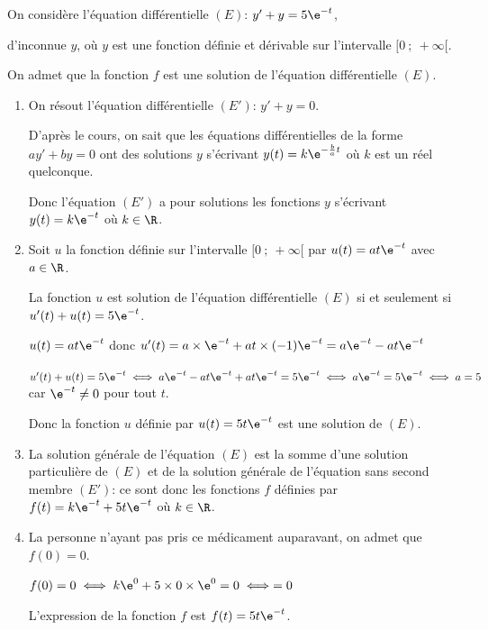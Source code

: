 \medskip

On considère l'équation différentielle  $(E)$: $y' +y = 5\e^{-t}$,

d'inconnue $y$, où $y$ est une fonction définie et dérivable sur l'intervalle $[0~;~+ \infty[$.

On admet que la fonction $f$ est une solution de l'équation différentielle $(E)$.



\begin{enumerate}
\item On résout l'équation différentielle $(E')$: $y' + y = 0$.

D'après le cours, on sait que les équations différentielles de la forme $ay'+by=0$ ont des solutions $y$ s'écrivant $y(t) = k\e^{-\frac{b}{a}t}$ où $k$ est un réel quelconque.

Donc l'équation $(E')$ a pour solutions les fonctions $y$ s'écrivant $y(t)=k\e^{-t}$ où $k\in\R$.

\item Soit $u$ la fonction définie sur l'intervalle $[0~;~ +\infty[$ par $u(t) = at\e^{-t}$ avec $a \in \R$.



La fonction $u$ est solution de l'équation différentielle $(E)$ si et seulement si $u'(t)+u(t)=5\e^{-t}$.

$u(t)=at\e^{-t}$ donc $u'(t)= a\times \e^{-t} + at\times (-1)\e^{-t}= a\e^{-t}-at\e^{-t}$

$u'(t)+u(t)=5\e^{-t}
\iff a\e^{-t}-at\e^{-t} + at\e^{-t}=5\e^{-t}
\iff a\e^{-t}=5\e^{-t}
\iff a=5$ car $\e^{-t}\neq 0$ pour tout $t$.

Donc la fonction $u$ définie par $u(t)=5t\e^{-t}$ est une solution de $(E)$.

\item
La solution générale de l'équation $(E)$ est la somme d'une solution particulière de $(E)$ et de la solution générale de l'équation sans second membre $(E')$: ce sont donc les fonctions $f$ définies par $f(t)=k\e^{-t}+5t\e^{-t}$ où $k\in\R$.

\item La personne n'ayant pas pris ce médicament auparavant, on admet que $f(0) = 0$.



$f(0)=0 \iff k\e^{0}+5\times 0 \times \e^{0}=0 \iff = 0$

L'expression de la fonction $f$ est $f(t)=5t\e^{-t}$.

\end{enumerate}

